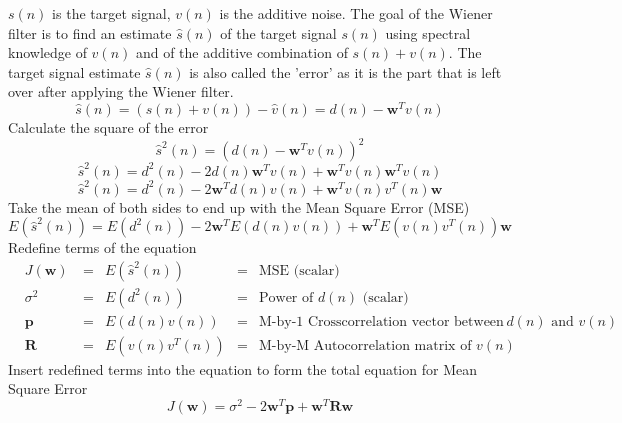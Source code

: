 $s(n)$ is the target signal, $v(n)$ is the additive noise. The goal of the Wiener filter is to find an estimate $\hat{s}(n)$ of the target signal $s(n)$ using spectral knowledge of $v(n)$ and of the additive combination of $s(n)+v(n)$. The target signal estimate $\hat{s}(n)$ is also called the 'error' as it is the part that is left over after applying the Wiener filter.
  \begin{equation}\label{eq:start_wiener}
    \hat{s}(n) = (s(n) + v(n)) - \hat{v}(n) = d(n) - \boldsymbol{w}^T v(n)
  \end{equation}
Calculate the square of the error \cite{lecture_adaptive_filters_1}
\begin{equation}
    \hat{s}^2(n) = (d(n) - \boldsymbol{w}^T v(n))^2
\end{equation}
\begin{equation}
    \hat{s}^2(n) = d^2(n) - 2d(n)\boldsymbol{w}^T v(n) + \boldsymbol{w}^T v(n)\boldsymbol{w}^T v(n)
\end{equation}
\begin{equation}
    \hat{s}^2(n) = d^2(n) - 2 \boldsymbol{w}^T d(n) v(n) + \boldsymbol{w}^T v(n) v^T(n) \boldsymbol{w}
\end{equation}
Take the mean of both sides to end up with the Mean Square Error (MSE) \cite{lecture_adaptive_filters_1}
\begin{equation}
    E(\hat{s}^2(n)) = E(d^2(n)) - 2 \boldsymbol{w}^T E(d(n) v(n)) + \boldsymbol{w}^T E(v(n) v^T(n)) \boldsymbol{w}
\end{equation}
Redefine terms of the equation \cite{lecture_adaptive_filters_1}
\begin{align*}
&J(\boldsymbol{w}) \                  &=& E(\hat{s}^2(n))  &=& \text{MSE (scalar)} \\
&\sigma^2 \           &=& E(d^2(n))        &=& \text{Power of }d(n) \text{ (scalar)} \\
&\boldsymbol{p} \      &=& E(d(n) v(n))     &=& \text{M-by-1 Crosscorrelation vector between } d(n) \text{ and } v(n)  \\
&\boldsymbol{R} \      &=& E(v(n) v^T(n))  &=& \text{M-by-M Autocorrelation matrix of } v(n)
\end{align*}
Insert redefined terms into the equation to form the total equation for Mean Square Error \cite{lecture_adaptive_filters_1}
\begin{equation}
    J(\boldsymbol{w}) = \sigma^2 - 2 \boldsymbol{w}^T \boldsymbol{p} + \boldsymbol{w}^T \boldsymbol{R} \boldsymbol{w}
\end{equation}
